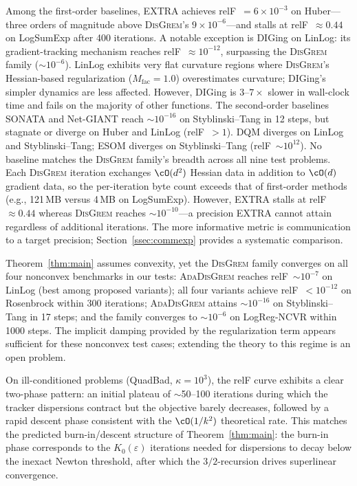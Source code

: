 \documentclass[review,onefignum,onetabnum]{siamart171218}
\begin{document}
	Among the first-order baselines,
	EXTRA achieves relF~$=6{\times}10^{-3}$ on Huber---three
	orders of magnitude above \textsc{DisGrem}'s
	$9{\times}10^{-6}$---and
	stalls at relF~$\approx0.44$ on LogSumExp after 400
	iterations.
	A notable exception is DIGing on LinLog: its gradient-tracking
	mechanism reaches relF~$\approx10^{-12}$, surpassing the
	\textsc{DisGrem} family ($\sim10^{-6}$).
	LinLog exhibits very flat curvature regions where
	\textsc{DisGrem}'s Hessian-based regularization
	($M_{\mathrm{fac}}{=}1.0$) overestimates curvature;
	DIGing's simpler dynamics are less affected.
	However, DIGing is $3$--$7\times$ slower in wall-clock time
	and fails on the majority of other functions.
	The second-order baselines SONATA and Net-GIANT reach $\sim10^{-16}$ on
	Styblinski--Tang in 12 steps, but stagnate or diverge on
	Huber and LinLog (relF~$>1$).
	DQM diverges on LinLog and Styblinski--Tang; ESOM diverges
	on Styblinski--Tang (relF~$\sim10^{12}$).
	No baseline matches the \textsc{DisGrem} family's breadth
	across all nine test problems.
	Each \textsc{DisGrem} iteration exchanges $\cO(d^2)$ Hessian
	data in addition to $\cO(d)$ gradient data, so the
	per-iteration byte count exceeds that of first-order methods
	(e.g., 121\,MB versus 4\,MB on LogSumExp).
	However, EXTRA stalls at relF~$\approx0.44$ whereas
	\textsc{DisGrem} reaches $\sim10^{-10}$---a precision EXTRA
	cannot attain regardless of additional iterations.
	The more informative metric is communication to a
	target precision; Section~\ref{ssec:commexp} provides a
	systematic comparison.

	Theorem~\ref{thm:main} assumes convexity, yet the \textsc{DisGrem}
	family converges on all four nonconvex benchmarks in our tests:
	\textsc{AdaDisGrem} reaches relF~$\sim10^{-7}$ on LinLog (best
	among proposed variants); all four variants achieve
	relF~$<10^{-12}$ on Rosenbrock within 300 iterations;
	\textsc{AdaDisGrem} attains $\sim10^{-16}$ on Styblinski--Tang in
	17 steps; and the family converges to $\sim10^{-6}$ on
	LogReg-NCVR within 1000 steps.
	The implicit damping provided by the regularization term appears
	sufficient for these nonconvex test cases; extending the theory
	to this regime is an open problem.

	On ill-conditioned problems (QuadBad, $\kappa{=}10^3$), the relF
	curve exhibits a clear two-phase pattern: an initial plateau of
	$\sim$50--100 iterations during which the tracker dispersions
	contract but the objective barely decreases, followed by a rapid
	descent phase consistent with the $\cO(1/k^2)$ theoretical rate.
	This matches the predicted burn-in/descent structure of
	Theorem~\ref{thm:main}: the burn-in phase corresponds to the
	$K_0(\varepsilon)$ iterations needed for dispersions to decay below
	the inexact Newton threshold, after which the $3/2$-recursion
	drives superlinear convergence.
	
\end{document}
